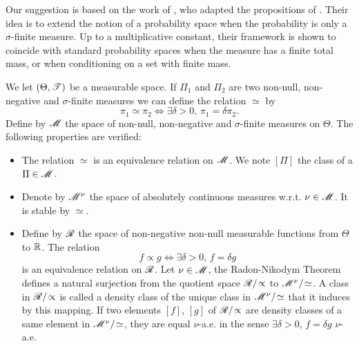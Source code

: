
Our suggestion is based on the work of \citet{taraldsen_conditional_2016}, who adapted the propositions of \citet{renyi_foundations_1970}. Their idea is to extend the notion of a probability space when the probability is only a $\sigma$-finite measure. Up to a multiplicative constant, their framework is shown to coincide with standard probability spaces when the measure has a finite total mass, or when conditioning on a set with finite mass.


We let $(\Theta,\mathscr{T})$ be a measurable space. If $\Pi_1$ and $\Pi_2$ are two non-null, non-negative and $\sigma$-finite  measures we can define the relation $\simeq$ by
    \begin{equation}
        \pi_1\simeq\pi_2\Longleftrightarrow\exists\delta>0,\,\pi_1=\delta\pi_2.
    \end{equation}
Define by $\mathscr{M}$ the space of non-null, non-negative and $\sigma$-finite measures on $\Theta$. The following properties are verified:
    \begin{itemize}
        \item The relation $\simeq$ is an equivalence relation on $\mathscr{M}$. We note $[\Pi]$ the class of a $\Pi\in\mathscr{M}$.
        \item Denote by $\mathscr{M}^\nu$ the space of absolutely continuous measures w.r.t. $\nu\in\mathscr{M}$. It is stable by $\simeq$.
        \item Define by $\mathscr{R}$ the space of non-negative non-null measurable functions from $\Theta$ to $\mathbb{R}$. The relation%
            \begin{equation}
                f\propto g \Longleftrightarrow\exists\delta>0,\,f=\delta g%
            \end{equation}
        is an equivalence relation on $\mathscr{R}$. %
        Let $\nu\in\mathscr{M}$, the Radon-Nikodym Theorem defines a natural surjection from the quotient space $\mathscr{R}/\!\propto$ to $\mathscr{M}^\nu/\!\simeq$. 
        A class in $\mathscr{R}/\!\propto$ is called a density class of the unique class in $\mathscr{M}^\nu/\!\simeq$ that it induces by this mapping. If two elements $[f]$, $[g]$ of $\mathscr{R}/\!\propto$ are density classes of a same element in $\mathscr{M}^\nu/\!\simeq$, they are equal $\nu$-a.e. in the sense $\exists\delta>0$, $f=\delta g$ $\nu$-a.e.
    \end{itemize}

